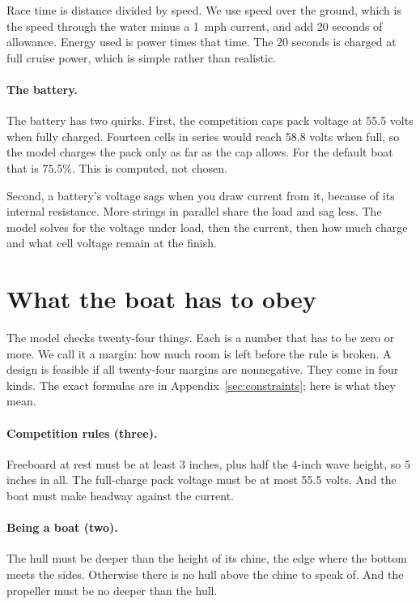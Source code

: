 \documentclass[11pt,a4paper]{article}
\renewcommand{\_}{\textunderscore\allowbreak}
\begin{document}
Race time is distance divided by speed. We use speed over the ground, which is the speed through the water minus a 1~mph current, and add 20 seconds of allowance. Energy used is power times that time.
The 20 seconds is charged at full cruise power, which is simple rather than realistic.

\paragraph{The battery.} The battery has two quirks. First, the competition caps pack voltage at 55.5 volts when fully charged. Fourteen cells in series would reach 58.8 volts when full, so the model charges the pack only as far as the cap allows.
For the default boat that is 75.5\%. This is computed, not chosen.

Second, a battery's voltage sags when you draw current from it, because of its internal resistance. More strings in parallel share the load and sag less. The model solves for the voltage under load, then the current,
then how much charge and what cell voltage remain at the finish.

\section*{What the boat has to obey}

The model checks twenty-four things. Each is a number that has to be zero or more. We call it a margin: how much room is left before the rule is broken. A design is feasible if all twenty-four margins are nonnegative.
They come in four kinds. The exact formulas are in Appendix~\ref{sec:constraints}; here is what they mean.

\paragraph{Competition rules (three).} Freeboard at rest must be at least 3 inches, plus half the 4-inch wave height, so 5 inches in all. The full-charge pack voltage must be at most 55.5 volts.
And the boat must make headway against the current.

\paragraph{Being a boat (two).} The hull must be deeper than the height of its chine, the edge where the bottom meets the sides. Otherwise there is no hull above the chine to speak of.
And the propeller must be no deeper than the hull.
\end{document}
